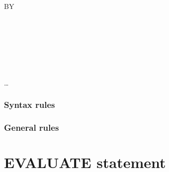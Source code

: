 \begin{syntax}[\miscextcolour]
  \begin{minipage}[!h]{1.0\linewidth}
     \literal

    \begin{0-1}

      \begin{1=}
        \begin{0-1}
          BY
          \begin{1=}
             \\
             \\
          \end{1=}
        \end{0-1}

        \begin{1=}
           \\

          \begin{1=}
            \begin{1=}
              \identifier \\
              \literal
            \end{1=}
          \end{1=}
        \end{1=}\ldots
      \end{1=}
    \end{0-1}
  \end{minipage}
\end{syntax}

\subsubsection{Syntax rules}

\subsubsection{General rules}

\section{EVALUATE statement}

